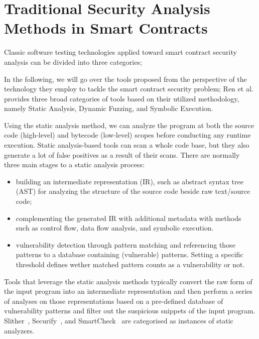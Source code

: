 \section{Traditional Security Analysis Methods in Smart Contracts}

Classic software testing technologies applied toward smart contract security analysis can be divided into three categories;

In the following, we will go over the tools proposed from the perspective of the technology they employ to tackle the smart contract security problem;
Ren et al.~\cite{Empirical-Evaluation-of-Smart-Contract-Testing:What-is-the-Best-Choice} provides three broad categories of tools based on their utilized methodology,
namely Static Analysis, Dynamic Fuzzing, and Symbolic Execution.

Using the static analysis method, we can analyze the program at both the source code (high-level) and bytecode (low-level) scopes before conducting any runtime execution.
Static analysis-based tools can scan a whole code base, but they also generate a lot of false positives as a result of their scans.
There are normally three main stages to a static analysis process:
\begin{itemize}
  \item building an intermediate representation (IR), such as abstract syntax tree (AST) for analyzing the structure of the source code beside raw text/source code;
  \item complementing the generated IR with additional metadata with methods such as control flow, data flow analysis, and symbolic execution.
  \item vulnerability detection through pattern matching and referencing those patterns to a database containing (vulnerable) patterns. Setting a specific threshold defines wether matched pattern counts as a vulnerability or not.
\end{itemize}
Tools that leverage the static analysis methods typically convert the raw form of the input program into an intermediate representation and then perform a series of analyses on those representations based on a pre-defined database of vulnerability patterns and filter out the suspicious snippets of the input program.
Slither~\cite{slither}, Securify~\cite{securify}, and SmartCheck~\cite{securify} are categorised as instances of static analyzers.

